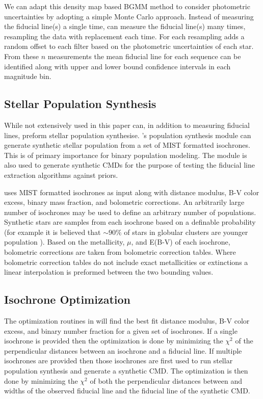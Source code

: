 We can adapt this density map based BGMM method to consider photometric
uncertainties by adopting a simple Monte Carlo approach. Instead of measuring
the fiducial line(s) a single time, \fidanka can measure the fiducial line(s)
many times, resampling the data with replacement each time. For each resampling
\fidanka adds a random offset to each filter based on the photometric
uncertainties of each star. From these $n$ measurements the mean fiducial line
for each sequence can be identified along with upper and lower bound confidence
intervals in each magnitude bin.

\subsection{Stellar Population Synthesis}
While not extensively used in this paper \fidanka can, in addition to measuring fiducial
lines, preform stellar population synthesise. \fidanka's population synthesis
module can generate synthetic stellar population from a set of MIST formatted
isochrones. This is of primary importance for binary population modeling. The
module is also used to generate synthetic CMDs for the purpose of testing the
fiducial line extraction algorithms against priors.

\fidanka uses MIST formatted isochrones \citep{Dotter2016} as input along
with distance modulus, B-V color excess, binary mass fraction, and bolometric
corrections. An arbitrarily large number of isochrones may be used to define an
arbitrary number of populations. Synthetic stars are samples from each
isochrone based on a definable probability (for example it is believed that
$\sim90\%$ of stars in globular clusters are younger population
\citep[e.g.][]{Suntzeff1996, Carretta2013}). Based on the metallicity, $\mu$, and E(B-V) of each
isochrone, bolometric corrections are taken from bolometric correction tables.
Where bolometric correction tables do not include exact metallicities or
extinctions a linear interpolation is preformed between the two bounding
values. 

\subsection{Isochrone Optimization}
The optimization routines in \fidanka will find the best fit distance modulus,
B-V color excess, and binary number fraction for a given set of isochrones. If
a single isochrone is provided then the optimization is done by minimizing the
$\chi^2$ of the perpendicular distances between an isochrone and a fiducial
line. If multiple isochrones are provided then those isochrones are first used
to run stellar population synthesis and generate a synthetic CMD. The
optimization is then done by minimizing the $\chi^2$ of both the perpendicular
distances between and widths of the observed fiducial line and the fiducial
line of the synthetic CMD.


